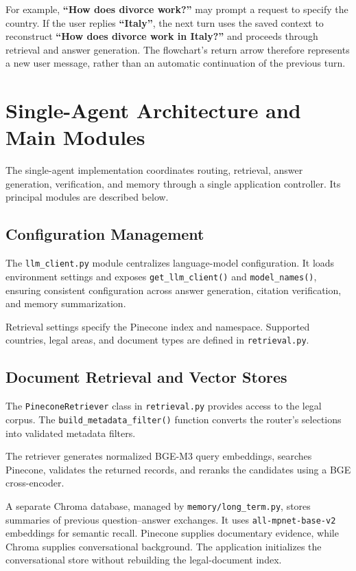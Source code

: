 \documentclass[a4paper,12pt]{report}
\begin{document}
For example, \textbf{``How does divorce work?''} may prompt a request
to specify the country. If the user replies \textbf{``Italy''}, the
next turn uses the saved context to reconstruct
\textbf{``How does divorce work in Italy?''} and proceeds through
retrieval and answer generation. The flowchart's return arrow
therefore represents a new user message, rather than an automatic
continuation of the previous turn.




\section{Single-Agent Architecture and Main Modules}
\label{sec:single-agent-architecture}
The single-agent implementation coordinates routing, retrieval,
answer generation, verification, and memory through a single
application controller. Its principal modules are described below.

\subsection{Configuration Management}

The \texttt{llm\_client.py} module centralizes language-model
configuration. It loads environment settings and exposes
\texttt{get\_llm\_client()} and \texttt{model\_names()}, ensuring
consistent configuration across answer generation, citation
verification, and memory summarization.

Retrieval settings specify the Pinecone index and namespace.
Supported countries, legal areas, and document types are defined
in \texttt{retrieval.py}.

\subsection{Document Retrieval and Vector Stores}

The \texttt{PineconeRetriever} class in \texttt{retrieval.py}
provides access to the legal corpus. The
\texttt{build\_metadata\_filter()} function converts the router's
selections into validated metadata filters.

The retriever generates normalized BGE-M3 query embeddings,
searches Pinecone, validates the returned records, and reranks
the candidates using a BGE cross-encoder.

A separate Chroma database, managed by
\texttt{memory/long\_term.py}, stores summaries of previous
question--answer exchanges. It uses \texttt{all-mpnet-base-v2}
embeddings for semantic recall. Pinecone supplies documentary
evidence, while Chroma supplies conversational background.
The application initializes the conversational store without
rebuilding the legal-document index.
\end{document}
